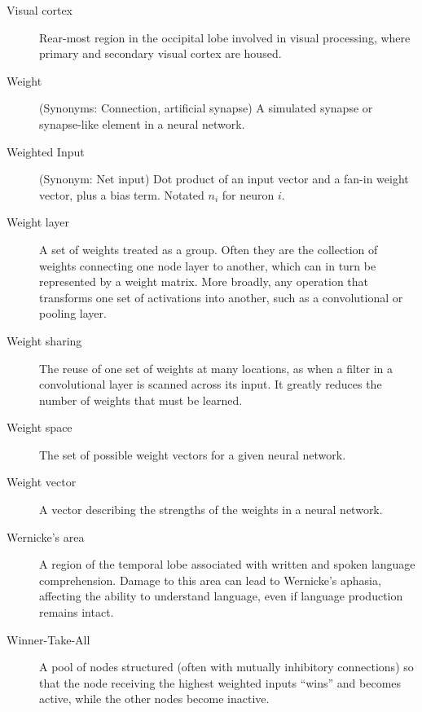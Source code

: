 \begin{description}

\item[Visual cortex] Rear-most region in the occipital lobe involved in visual processing, where primary and secondary visual cortex are housed.

\item[Weight] (Synonyms: Connection, artificial synapse) A simulated synapse or synapse-like element in a neural network.

\item[Weighted Input] (Synonym: Net input) Dot product of an input vector and a fan-in weight vector, plus a bias term. Notated $n_i$ for neuron $i$.

\item[Weight layer] A set of weights treated as a group. Often they are the collection of weights connecting one node layer to another, which can in turn be represented by a weight matrix. More broadly, any operation that transforms one set of activations into another, such as a convolutional or pooling layer. %

\item[Weight sharing] The reuse of one set of weights at many locations, as when a filter in a convolutional layer is scanned across its input. It greatly reduces the number of weights that must be learned.

\item[Weight space] The set of possible weight vectors for a given neural network.

\item[Weight vector] A vector describing the strengths of the weights in a neural network.

\item[Wernicke's area] A region of the temporal lobe associated with written and spoken language comprehension. Damage to this area can lead to Wernicke's aphasia, affecting the ability to understand language, even if language production remains intact.

\item[Winner-Take-All] A pool of nodes structured (often with mutually inhibitory connections) so that the node receiving the highest weighted inputs ``wins'' and becomes active, while the other nodes become inactive.


\end{description}
